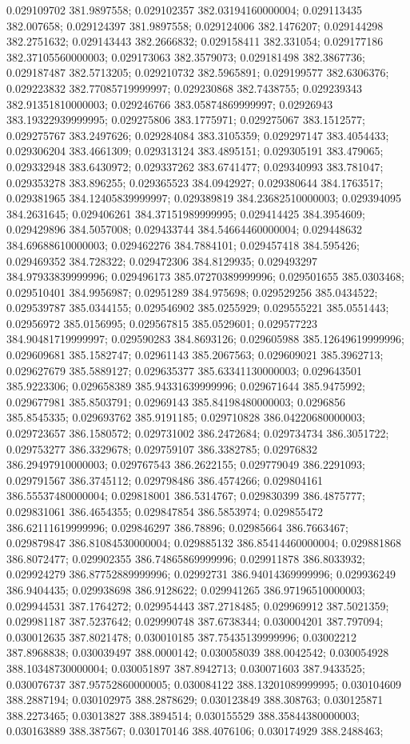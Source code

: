 0.029109702 381.9897558; 0.029102357 382.03194160000004; 0.029113435 382.007658; 0.029124397 381.9897558; 0.029124006 382.1476207; 0.029144298 382.2751632; 0.029143443 382.2666832; 0.029158411 382.331054; 0.029177186 382.37105560000003; 0.029173063 382.3579073; 0.029181498 382.3867736; 0.029187487 382.5713205; 0.029210732 382.5965891; 0.029199577 382.6306376; 0.029223832 382.77085719999997; 0.029230868 382.7438755; 0.029239343 382.91351810000003; 0.029246766 383.05874869999997; 0.02926943 383.19322939999995; 0.029275806 383.1775971; 0.029275067 383.1512577; 0.029275767 383.2497626; 0.029284084 383.3105359; 0.029297147 383.4054433; 0.029306204 383.4661309; 0.029313124 383.4895151; 0.029305191 383.479065; 0.029332948 383.6430972; 0.029337262 383.6741477; 0.029340993 383.781047; 0.029353278 383.896255; 0.029365523 384.0942927; 0.029380644 384.1763517; 0.029381965 384.12405839999997; 0.029389819 384.23682510000003; 0.029394095 384.2631645; 0.029406261 384.37151989999995; 0.029414425 384.3954609; 0.029429896 384.5057008; 0.029433744 384.54664460000004; 0.029448632 384.69688610000003; 0.029462276 384.7884101; 0.029457418 384.595426; 0.029469352 384.728322; 0.029472306 384.8129935; 0.029493297 384.97933839999996; 0.029496173 385.07270389999996; 0.029501655 385.0303468; 0.029510401 384.9956987; 0.02951289 384.975698; 0.029529256 385.0434522; 0.029539787 385.0344155; 0.029546902 385.0255929; 0.029555221 385.0551443; 0.02956972 385.0156995; 0.029567815 385.0529601; 0.029577223 384.90481719999997; 0.029590283 384.8693126; 0.029605988 385.12649619999996; 0.029609681 385.1582747; 0.02961143 385.2067563; 0.029609021 385.3962713; 0.029627679 385.5889127; 0.029635377 385.63341130000003; 0.029643501 385.9223306; 0.029658389 385.94331639999996; 0.029671644 385.9475992; 0.029677981 385.8503791; 0.02969143 385.84198480000003; 0.0296856 385.8545335; 0.029693762 385.9191185; 0.029710828 386.04220680000003; 0.029723657 386.1580572; 0.029731002 386.2472684; 0.029734734 386.3051722; 0.029753277 386.3329678; 0.029759107 386.3382785; 0.02976832 386.29497910000003; 0.029767543 386.2622155; 0.029779049 386.2291093; 0.029791567 386.3745112; 0.029798486 386.4574266; 0.029804161 386.55537480000004; 0.029818001 386.5314767; 0.029830399 386.4875777; 0.029831061 386.4654355; 0.029847854 386.5853974; 0.029855472 386.62111619999996; 0.029846297 386.78896; 0.02985664 386.7663467; 0.029879847 386.81084530000004; 0.029885132 386.85414460000004; 0.029881868 386.8072477; 0.029902355 386.74865869999996; 0.029911878 386.8033932; 0.029924279 386.87752889999996; 0.02992731 386.94014369999996; 0.029936249 386.9404435; 0.029938698 386.9128622; 0.029941265 386.97196510000003; 0.029944531 387.1764272; 0.029954443 387.2718485; 0.029969912 387.5021359; 0.029981187 387.5237642; 0.029990748 387.6738344; 0.030004201 387.797094; 0.030012635 387.8021478; 0.030010185 387.75435139999996; 0.03002212 387.8968838; 0.030039497 388.0000142; 0.030058039 388.0042542; 0.030054928 388.10348730000004; 0.030051897 387.8942713; 0.030071603 387.9433525; 0.030076737 387.95752860000005; 0.030084122 388.13201089999995; 0.030104609 388.2887194; 0.030102975 388.2878629; 0.030123849 388.308763; 0.030125871 388.2273465; 0.03013827 388.3894514; 0.030155529 388.35844380000003; 0.030163889 388.387567; 0.030170146 388.4076106; 0.030174929 388.2488463; 